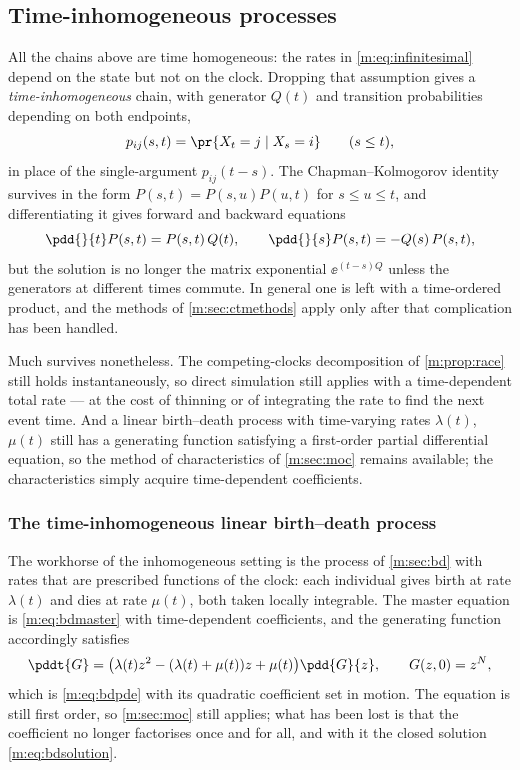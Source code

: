 \subsection{Time-inhomogeneous processes}
\label{m:sec:inhomogeneous}

All the chains above are time homogeneous: the rates in \cref{m:eq:infinitesimal}
depend on the state but not on the clock. Dropping that assumption gives a
\emph{time-inhomogeneous} chain, with generator $Q(t)$ and transition
probabilities depending on both endpoints,
\begin{equation}
\label{m:eq:inhomogtrans}
p_{ij}(s,t) = \pr{X_t=j\mid X_s=i}
\qquad(s\le t),
\end{equation}
in place of the single-argument $p_{ij}(t-s)$. The Chapman--Kolmogorov identity
survives in the form $P(s,t) = P(s,u)P(u,t)$ for $s\le u\le t$, and differentiating
it gives forward and backward equations
\begin{equation}
\label{m:eq:inhomogkolmogorov}
\pdd{}{t}P(s,t) = P(s,t)\,Q(t),
\qquad
\pdd{}{s}P(s,t) = -Q(s)\,P(s,t),
\end{equation}
but the solution is no longer the matrix exponential $\ee^{(t-s)Q}$ unless the
generators at different times commute. In general one is left with a
time-ordered product, and the methods of \cref{m:sec:ctmethods} apply only after
that complication has been handled.

Much survives nonetheless. The competing-clocks decomposition of
\cref{m:prop:race} still holds instantaneously, so direct simulation still applies
with a time-dependent total rate --- at the cost of thinning or of integrating the
rate to find the next event time. And a linear birth--death process with
time-varying rates $\lambda(t)$, $\mu(t)$ still has a generating function
satisfying a first-order partial differential equation, so the method of
characteristics of \cref{m:sec:moc} remains available; the characteristics simply
acquire time-dependent coefficients.

\subsubsection{The time-inhomogeneous linear birth--death process}
\label{m:sec:tibd}

The workhorse of the inhomogeneous setting is the process of \cref{m:sec:bd} with
rates that are prescribed functions of the clock: each individual gives birth at
rate $\lambda(t)$ and dies at rate $\mu(t)$, both taken locally integrable. The
master equation is \cref{m:eq:bdmaster} with time-dependent coefficients, and the
generating function accordingly satisfies
\begin{equation}
\label{m:eq:tibdpde}
\pddt{G} = \bigl(\lambda(t)z^2-(\lambda(t)+\mu(t))z+\mu(t)\bigr)\pdd{G}{z},
\qquad
G(z,0)=z^N ,
\end{equation}
which is \cref{m:eq:bdpde} with its quadratic coefficient set in motion. The
equation is still first order, so \cref{m:sec:moc} still applies; what has been
lost is that the coefficient no longer factorises once and for all, and with it
the closed solution \cref{m:eq:bdsolution}.

